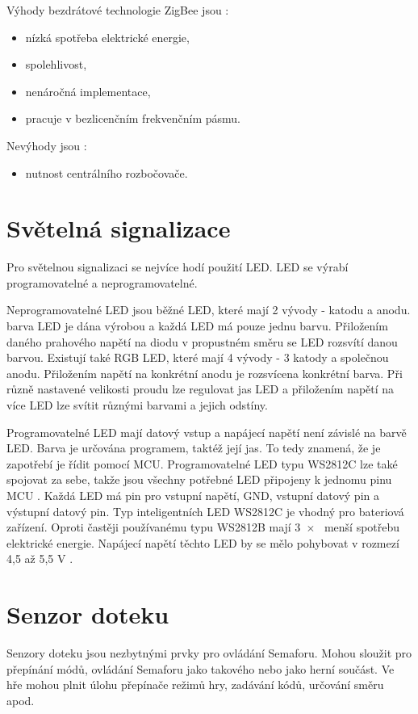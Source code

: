 Výhody bezdrátové technologie ZigBee jsou \cite{ZigBee_smart}:
\begin{itemize}
  \item nízká spotřeba elektrické energie,
  \item spolehlivost, 
  \item nenáročná implementace,
  \item pracuje v bezlicenčním frekvenčním pásmu. 
\end{itemize}

Nevýhody jsou \cite{ZigBee_smart}:
\begin{itemize}
  \item nutnost centrálního rozbočovače.
\end{itemize}

\section{Světelná signalizace}
Pro světelnou signalizaci se nejvíce hodí použití LED. LED se výrabí programovatelné a neprogramovatelné. 

Neprogramovatelné LED jsou běžné LED, které mají 2 vývody - katodu a anodu. barva LED je dána výrobou a každá LED má pouze jednu 
barvu. Přiložením daného prahového napětí na diodu v propustném směru se LED rozsvítí danou barvou. Existují také RGB LED, které 
mají 4 vývody - 3 katody a společnou anodu. Přiložením napětí na konkrétní anodu je rozsvícena konkrétní barva. Při různě nastavené
velikosti proudu lze regulovat jas LED a přiložením napětí na více LED lze svítit různými barvami a jejich odstíny. 

Programovatelné LED mají datový vstup a napájecí napětí není závislé na barvě LED. 
Barva je určována programem, taktéž její jas. To tedy znamená, že je zapotřebí je řídit 
pomocí MCU. Programovatelné LED typu WS2812C lze také spojovat za sebe, takže jsou všechny potřebné LED připojeny k jednomu pinu 
MCU \cite{WS2812C_dtsh}. Každá LED má pin pro vstupní napětí, GND, vstupní datový pin a výstupní datový pin. Typ inteligentních LED 
WS2812C je vhodný pro bateriová zařízení. Oproti častěji používanému typu WS2812B mají 3~$\times$~ menší spotřebu elektrické energie. 
Napájecí napětí těchto LED by se mělo pohybovat v rozmezí 4,5 až 5,5 V \cite{WS2812C_dtsh}. 

\section{Senzor doteku}
Senzory doteku jsou nezbytnými prvky pro ovládání Semaforu. Mohou sloužit pro přepínání módů, ovládání Semaforu jako takového nebo jako herní 
součást. Ve hře mohou plnit úlohu přepínače režimů hry, zadávání kódů, určování směru apod. 

